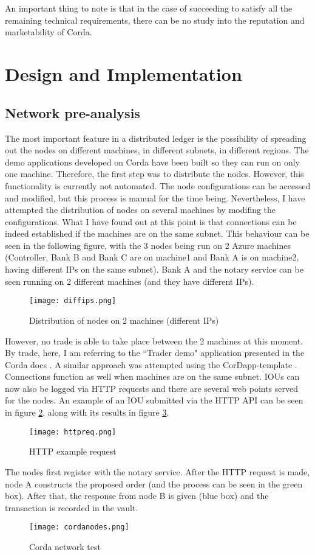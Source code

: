 \documentclass[12pt,twoside]{article}
\begin{document}
\\ \\
An important thing to note is that in the case of succeeding to satisfy all the remaining technical requirements, there can be no study into the reputation and marketability of Corda.
\newpage
\section{Design and Implementation}
\label{sec:DesignImplementation}
\subsection{Network pre-analysis}
\label{sub:Network}
The most important feature in a distributed ledger is the possibility of spreading out the nodes on different machines, in different subnets, in different regions. The demo applications developed on Corda have been built so they can run on only one machine. Therefore, the first step was to distribute the nodes. However, this functionality is currently not automated. The node configurations can be accessed and modified, but this process is manual for the time being. Nevertheless, I have attempted the distribution of nodes on several machines by modifing the configurations. What I have found out at this point is that connections can be indeed established if the machines are on the same subnet. This behaviour can be seen in the following figure, with the 3 nodes being run on 2 Azure machines (Controller, Bank B and Bank C are on machine1 and Bank A is on machine2, having different IPs on the same subnet). Bank A and the notary service can be seen running on 2 different machines (and they have different IPs). 
\begin{figure}[H]
\centering
\texttt{[image: diffips.png]}
\caption{Distribution of nodes on 2 machines (different IPs)}
\centering
\label{fig:IPs}
\end{figure}

However, no trade is able to take place between the 2 machines at this moment. By trade, here, I am referring to the ``Trader demo" application presented in the Corda docs \cite{Corda:docs}. A similar approach was attempted using the CorDapp-template \cite{Corda:template}. Connections function as well when machines are on the same subnet. IOUs can now also be logged via HTTP requests and there are several web points served for the nodes. An example of an IOU submitted via the HTTP API can be seen in figure \ref{fig:CNT}, along with its results in figure \ref{fig:NT}. 
\begin{figure}[H]
\centering
\texttt{[image: httpreq.png]}
\caption{HTTP example request}
\centering
\label{fig:CNT}
\end{figure}
The nodes first register with the notary service. After the HTTP request is made, node A constructs the proposed order (and the process can be seen in the green box). After that, the response from node B is given (blue box) and the transaction is recorded in the vault.
\begin{figure}[H]
\centering
\texttt{[image: cordanodes.png]}
\caption{Corda network test}
\centering
\label{fig:NT}
\end{figure}
\end{document}
